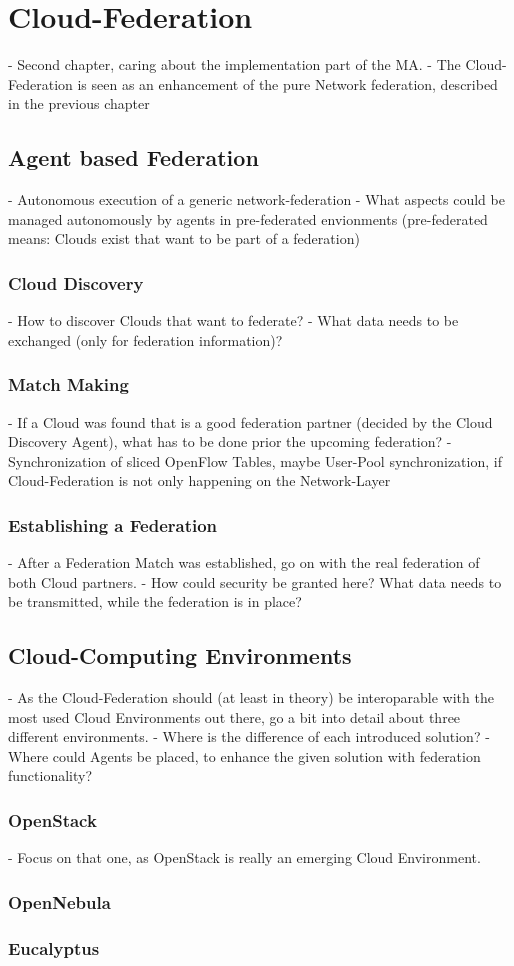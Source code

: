\chapter{Cloud-Federation}
- Second chapter, caring about the implementation part of the MA.
- The Cloud-Federation is seen as an enhancement of the pure Network federation, described in the previous chapter


\section{Agent based Federation}
- Autonomous execution of a generic network-federation
- What aspects could be managed autonomously by agents in pre-federated envionments (pre-federated means: Clouds exist that want to be part of a federation) 

\subsection{Cloud Discovery}
- How to discover Clouds that want to federate?
- What data needs to be exchanged (only for federation information)?

\subsection{Match Making}
- If a Cloud was found that is a good federation partner (decided by the Cloud Discovery Agent), what has to be done prior the upcoming federation?
- Synchronization of sliced OpenFlow Tables, maybe User-Pool synchronization, if Cloud-Federation is not only happening on the Network-Layer

\subsection{Establishing a Federation}
- After a Federation Match was established, go on with the real federation of both Cloud partners.
- How could security be granted here? What data needs to be transmitted, while the federation is in place? 



\section{Cloud-Computing Environments}
- As the Cloud-Federation should (at least in theory) be interoparable with the most used Cloud Environments out there, go a bit into detail about three different environments.
- Where is the difference of each introduced solution?
- Where could Agents be placed, to enhance the given solution with federation functionality?

\subsection{OpenStack}
- Focus on that one, as OpenStack is really an emerging Cloud Environment.

\subsection{OpenNebula}

\subsection{Eucalyptus}
